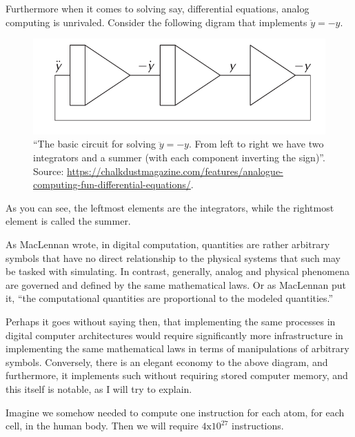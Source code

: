 Furthermore when it comes to solving say, differential equations, analog computing is unrivaled. Consider the following digram that implements $\ddot{y} = -y$. 

\begin{figure}[H]
    \centering
    \includegraphics[width=0.6\linewidth]{../assets/analogue-computing-fun-differential-equations.png}
    \caption{``The basic circuit for solving $\ddot{y} = -y$. From left to right we have two integrators and a summer (with each component inverting the sign)''. Source: \url{https://chalkdustmagazine.com/features/analogue-computing-fun-differential-equations/}.}
    \label{Image Label}
\end{figure}

As you can see, the leftmost elements are the integrators, while the rightmost element is called the summer. 

As MacLennan wrote, in digital computation, quantities are rather arbitrary symbols that have no direct relationship to the physical systems that such may be tasked with simulating. In contrast, generally, analog and physical phenomena are governed and defined by the same mathematical laws. Or as MacLennan put it, ``the computational quantities are proportional to the modeled quantities.''

Perhaps it goes without saying then, that implementing the same processes in digital computer architectures would require significantly more infrastructure in implementing the same mathematical laws in terms of manipulations of arbitrary symbols. Conversely, there is an elegant economy to the above diagram, and furthermore, it implements such without requiring stored computer memory, and this itself is notable, as I will try to explain.

Imagine we somehow needed to compute one instruction for each atom, for each cell, in the human body. Then we will require $4 \mathrm{x} 10^{27}$ instructions.



